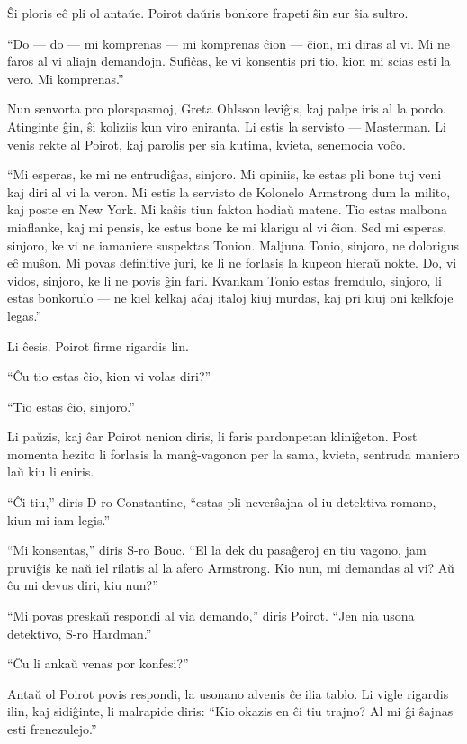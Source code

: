 Ŝi ploris eĉ pli ol antaŭe. Poirot daŭris bonkore frapeti ŝin sur ŝia sultro.

``Do --- do --- mi komprenas --- mi komprenas ĉion --- ĉion, mi diras al vi. Mi ne faros al vi aliajn demandojn. Sufiĉas, ke vi konsentis pri tio, kion mi scias esti la vero. Mi komprenas.''

Nun senvorta pro plorspasmoj, Greta Ohlsson leviĝis, kaj palpe iris al la pordo. Atinginte ĝin, ŝi koliziis kun viro eniranta. Li estis la servisto --- Masterman. Li venis rekte al Poirot, kaj parolis per sia kutima, kvieta, senemocia voĉo.

``Mi esperas, ke mi ne entrudiĝas, sinjoro. Mi opiniis, ke estas pli bone tuj veni kaj diri al vi la veron. Mi estis la servisto de Kolonelo Armstrong dum la milito, kaj poste en New York. Mi kaŝis tiun fakton hodiaŭ matene. Tio estas malbona miaflanke, kaj mi pensis, ke estus bone ke mi klarigu al vi ĉion. Sed mi esperas, sinjoro, ke vi ne iamaniere suspektas Tonion. Maljuna Tonio, sinjoro, ne dolorigus eĉ muŝon. Mi povas definitive ĵuri, ke li ne forlasis la kupeon hieraŭ nokte. Do, vi vidos, sinjoro, ke li ne povis ĝin fari. Kvankam Tonio estas fremdulo, sinjoro, li estas bonkorulo --- ne kiel kelkaj aĉaj italoj kiuj murdas, kaj pri kiuj oni kelkfoje legas.''

Li ĉesis. Poirot firme rigardis lin.

``Ĉu tio estas ĉio, kion vi volas diri?''

``Tio estas ĉio, sinjoro.''

Li paŭzis, kaj ĉar Poirot nenion diris, li faris pardonpetan kliniĝeton. Post momenta hezito li forlasis la manĝ-vagonon per la sama, kvieta, sentruda maniero laŭ kiu li eniris.

``Ĉi tiu,'' diris D-ro Constantine, ``estas pli neverŝajna ol iu detektiva romano, kiun mi iam legis.''

``Mi konsentas,'' diris S-ro Bouc. ``El la dek du pasaĝeroj en tiu vagono, jam pruviĝis ke naŭ iel rilatis al la afero Armstrong. Kio nun, mi demandas al vi? Aŭ ĉu mi devus diri, kiu nun?''

``Mi povas preskaŭ respondi al via demando,'' diris Poirot. ``Jen nia usona detektivo, S-ro Hardman.''

``Ĉu li ankaŭ venas por konfesi?''

Antaŭ ol Poirot povis respondi, la usonano alvenis ĉe ilia tablo. Li vigle rigardis ilin, kaj sidiĝinte, li malrapide diris: ``Kio okazis en ĉi tiu trajno? Al mi ĝi ŝajnas esti frenezulejo.''

